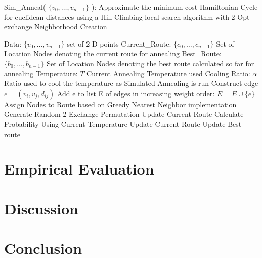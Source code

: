 \documentclass[format=sigconf]{acmart}
\begin{document}
\begin{algorithm}
	\caption{  Sim\_Anneal( $\{v_0, \hdots, v_{n-1}\}$ ): Approximate the minimum cost Hamiltonian Cycle for euclidean distances using a Hill Climbing local search algorithm with 2-Opt exchange Neighborhood Creation}
	\begin{algorithmic} 
		\STATE Data: $\{v_0, \hdots, v_{n-1}\}$ set of 2-D points
		\STATE Current\_Route: $\{c_0, \hdots, c_{n-1}\}$ Set of Location Nodes denoting the current route for annealing
		\STATE Best\_Route: $\{b_0, \hdots, b_{n-1}\}$ Set of Location Nodes denoting the best route calculated so far for annealing
		\STATE Temperature: $T$ Current Annealing Temperature used
		\STATE Cooling Ratio: $\alpha$ Ratio used to cool the temperature as Simulated Annealing is run
			\STATE Construct edge $e = (v_i, v_j, d_{ij})$
			\STATE Add e to list E of edges in increasing weight order: $E = E \cup \{e\}$
		\ENDFOR
			\STATE Assign Nodes to Route based on Greedy Nearest Neighbor implementation
		\ENDWHILE
			\STATE Generate Random 2 Exchange Permutation
				\STATE Update Current Route
			\ELSE
				\STATE Calculate Probability Using Current Temperature
					\STATE Update Current Route
				\ENDIF
			\ENDIF
				\STATE Update Best route
			\ENDIF
		\ENDWHILE
	\end{algorithmic}
\end{algorithm}
\section*{Empirical Evaluation}
\section*{Discussion}
\section*{Conclusion}


\end{document}
